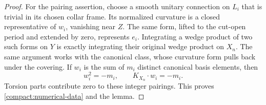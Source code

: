 \begin{proof}
For the pairing assertion, choose a smooth unitary connection on $L_i$
that is trivial in its chosen collar frame. Its normalized curvature is
a closed representative of $w_i$, vanishing near $Z$. The same form,
lifted to the cut-open period and extended by zero, represents $e_i$.
Integrating a wedge product of two such forms on $Y$ is exactly
integrating their original wedge product on $X_n$. The same argument
works with the canonical class, whose curvature form pulls back under
the covering. If $w_i$ is the sum of $m_i$ distinct canonical basis
elements, then
\[
 w_i^2=-m_i,\qquad K_{X_n}\cdot w_i=-m_i.
\]
Torsion parts contribute zero to these integer pairings. This proves
\eqref{compact:numerical-data} and the lemma.
\end{proof}
